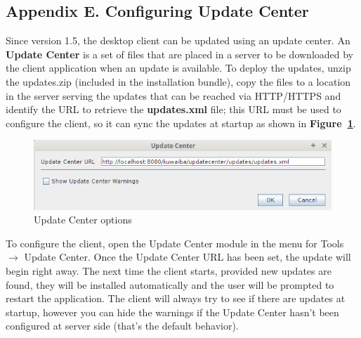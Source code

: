 \documentclass[a4paper]{article}
\begin{document}
\begin{appendices}
			\section{Appendix E. Configuring Update Center} \label{app:AppendixE}
			Since version 1.5, the desktop client can be updated using an update center. An \textbf{Update Center} is a set of files that are placed in a server to be downloaded by the client application when an update is available. To deploy the updates, unzip the updates.zip (included in the installation bundle), copy the files to a location in the server serving the updates that can be reached via HTTP/HTTPS and identify the URL to retrieve the \textbf{updates.xml} file; this URL must be used to configure the client, so it can sync the updates at startup as shown in \textbf{Figure~\ref{fig:update_center_options}}.
			
			\begin{figure}[h!]
				\centering
				\includegraphics[width=0.7\linewidth]{img/update_center.png}
				\caption{Update Center options}
				\label{fig:update_center_options}
			\end{figure}
						
			 To configure the client, open the Update Center module in the menu for Tools $\rightarrow$ Update Center. Once the Update Center URL has been set, the update will begin right away. The next time the client starts, provided new updates are found, they will be installed automatically and the user will be prompted to restart the application.
			\newline
			\newline
			The client will always try to see if there are updates at startup, however you can hide the warnings if the Update Center hasn't been configured at server side (that's the default behavior).
			
		\end{appendices}			
\end{document}
